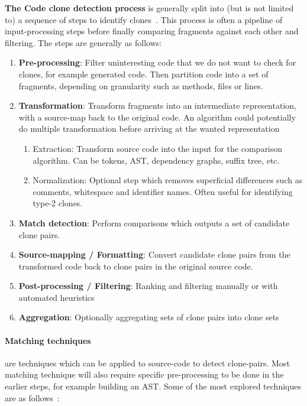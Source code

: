 \textbf{The Code clone detection process} is generally split into (but is not limited to)
a sequence of steps to identify clones~\cite{Inoue_introduction_to_cc}. This
process is often a pipeline of input-processing steps before finally comparing fragments
against each other and filtering. The steps are generally as follows:

\begin{enumerate}
	\item \textbf{Pre-processing}: Filter uninteresting code that we do not want to
	      check for clones, for example generated code. Then partition code into a set of
	      fragments, depending on granularity such as methods, files or lines.
	\item \textbf{Transformation}: Transform fragments into an intermediate
	      representation, with a source-map back to the original code. An algorithm
          could potentially do multiple transformation before arriving at the wanted
          representation
	      \begin{enumerate}
		      \item Extraction: Transform source code into the input for the comparison
		            algorithm. Can be tokens, AST, dependency graphs, suffix tree, etc.
		      \item Normalization: Optional step which removes superficial differences such as
		            comments, whitespace and identifier names. Often useful for identifying type-2
		            clones.
	      \end{enumerate}
	\item \textbf{Match detection}: Perform comparisons which outputs a set of
	      candidate clone pairs.
	\item \textbf{Source-mapping / Formatting}: Convert candidate clone pairs from the transformed
	      code back to clone pairs in the original source code.
	\item \textbf{Post-processing / Filtering}: Ranking and filtering manually or with
	      automated heuristics
	\item \textbf{Aggregation}: Optionally aggregating sets of clone pairs into clone sets
\end{enumerate}

\paragraph{Matching techniques} are techniques which can be applied to source-code to
detect clone-pairs. Most matching technique will also require specific pre-processing to be
done in the earlier steps, for example building an AST. Some of the most explored
techniques are as follows~\cite{ComparisonAndEvaluationOfTechniques}:

